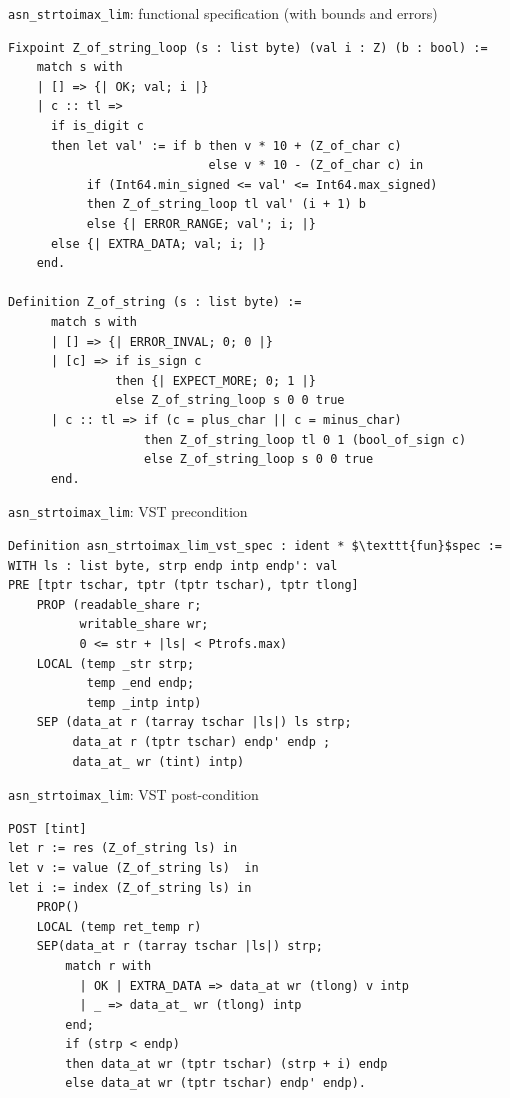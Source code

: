 \documentclass[10pt,usenames,dvipsnames,landscape]{beamer}
\begin{document}
\begin{frame}[fragile]{\texttt{asn\_strtoimax\_lim}: functional specification (with bounds and errors)}
\begin{lstlisting}[language=Coq, basicstyle=\fontsize{7}{8}\selectfont\ttfamily]
Fixpoint Z_of_string_loop (s : list byte) (val i : Z) (b : bool) := 
    match s with 
    | [] => {| OK; val; i |}
    | c :: tl => 
      if is_digit c
      then let val' := if b then v * 10 + (Z_of_char c) 
                            else v * 10 - (Z_of_char c) in 
           if (Int64.min_signed <= val' <= Int64.max_signed) 
           then Z_of_string_loop tl val' (i + 1) b
           else {| ERROR_RANGE; val'; i; |}      
      else {| EXTRA_DATA; val; i; |}              
    end.
    
Definition Z_of_string (s : list byte) := 
      match s with 
      | [] => {| ERROR_INVAL; 0; 0 |} 
      | [c] => if is_sign c
               then {| EXPECT_MORE; 0; 1 |} 
               else Z_of_string_loop s 0 0 true
      | c :: tl => if (c = plus_char || c = minus_char) 
                   then Z_of_string_loop tl 0 1 (bool_of_sign c)
                   else Z_of_string_loop s 0 0 true
      end.    

 \end{lstlisting}


\end{frame}



\begin{frame}[fragile]{\texttt{asn\_strtoimax\_lim}: VST precondition}
\begin{lstlisting}[language=Coq]
Definition asn_strtoimax_lim_vst_spec : ident * $\texttt{fun}$spec :=
WITH ls : list byte, strp endp intp endp': val
PRE [tptr tschar, tptr (tptr tschar), tptr tlong]
    PROP (readable_share r;
          writable_share wr;
          0 <= str + |ls| < Ptrofs.max)
    LOCAL (temp _str strp;    
           temp _end endp; 
           temp _intp intp)            
    SEP (data_at r (tarray tschar |ls|) ls strp; 
         data_at r (tptr tschar) endp' endp ;
         data_at_ wr (tint) intp) 
\end{lstlisting}

\end{frame}

\begin{frame}[fragile]{\texttt{asn\_strtoimax\_lim}: VST post-condition}
\begin{lstlisting}[language=Coq]
POST [tint]
let r := res (Z_of_string ls) in
let v := value (Z_of_string ls)  in
let i := index (Z_of_string ls) in
    PROP()
    LOCAL (temp ret_temp r)
    SEP(data_at r (tarray tschar |ls|) strp;          
        match r with 
          | OK | EXTRA_DATA => data_at wr (tlong) v intp 
          | _ => data_at_ wr (tlong) intp
        end;
        if (strp < endp)
        then data_at wr (tptr tschar) (strp + i) endp
        else data_at wr (tptr tschar) endp' endp).
\end{lstlisting}

\end{frame}
\end{document}
